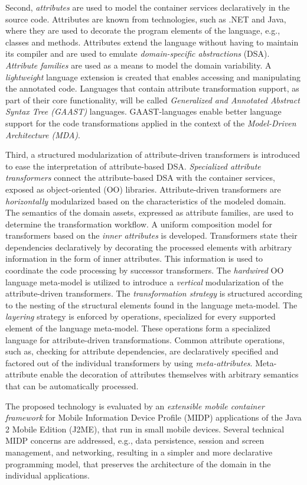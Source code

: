 Second, \textit{attributes} are used to model the container services declaratively in the source code. Attributes are known from technologies, such as .NET and Java, where they are used to decorate the program elements of the language, e.g., classes and methods. Attributes extend the language without having to maintain its compiler and are used to emulate \textit{domain-specific abstractions} (DSA). \textit{Attribute families} are used as a means to model the domain variability. A \textit{lightweight} language extension is created that enables accessing and manipulating the annotated code. Languages that contain attribute transformation support, as part of their core functionality, will be called \textit{Generalized and Annotated Abstract Syntax Tree (GAAST)} languages. GAAST-languages enable better language support for the code transformations applied in the context of the \textit{Model-Driven Architecture (MDA)}.

Third, a structured modularization of attribute-driven transformers is introduced to ease the interpretation of attribute-based DSA. \textit{Specialized attribute transformers} connect the attribute-based DSA with the container services, exposed as object-oriented (OO) libraries. Attribute-driven transformers are \textit{horizontally} modularized based on the characteristics of the modeled domain. The semantics of the domain assets, expressed as attribute families, are used to determine the transformation workflow. A uniform composition model for transformers based on the \textit{inner attributes} is developed. Transformers state their dependencies declaratively by decorating the processed elements with arbitrary information in the form of inner attributes. This information is used to coordinate the code processing by successor transformers. The \textit{hardwired} OO language meta-model is utilized to introduce a \textit{vertical} modularization of the attribute-driven transformers. The \textit{transformation strategy} is structured according to the nesting of the structural elements found in the language meta-model. The \textit{layering} strategy is enforced by operations, specialized for every supported element of the language meta-model. These operations form a specialized language for attribute-driven transformations. Common attribute operations, such as, checking for attribute dependencies, are declaratively specified and factored out of the individual transformers by using \textit{meta-attributes}. Meta-attribute enable the decoration of attributes themselves with arbitrary semantics that can be automatically processed.

The proposed technology is evaluated by an \textit{extensible mobile container framework} for Mobile Information Device Profile (MIDP) applications of the Java 2 Mobile Edition (J2ME), that run in small mobile devices. Several technical MIDP concerns are addressed, e.g., data persistence, session and screen management, and networking, resulting in a simpler and more declarative programming model, that preserves the architecture of the domain in the individual applications.
